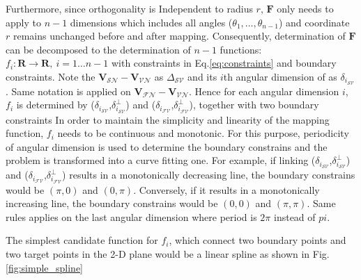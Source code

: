 Furthermore, since orthogonality is Independent to radius $r$, $\mathbf{F}$ only needs to apply to $n-1$ dimensions which includes all angles ($\theta_1,\dots,\theta_{n-1}$) and coordinate $r$ remains unchanged before and after mapping. Consequently, determination of $\mathbf{F}$ can be decomposed to the determination of $n-1$ functions: $f_i: \mathbf{R}\to \mathbf{R},~i=1\dots n-1$ with constraints in Eq.\ref{eq:constraints} and boundary constraints. %
Note the $\mathbf{V}_{\mathcal{SN}} - \mathbf{V}_{\mathcal{VN}}$ as $\Delta_{\mathcal{SV}}$ and its $i$th angular dimension of as $\delta_{i_{{\mathcal{SV}}}}$. Same notation is applied on $\mathbf{V}_{\mathcal{FN}} - \mathbf{V}_{\mathcal{VN}}$. %
Hence for each angular dimension $i$, $f_i$ is determined by ($\delta_{i_{{\mathcal{SV}}}}$,$\delta^{\perp}_{i_{{\mathcal{SV}}}}$) and ($\delta_{i_{{\mathcal{FV}}}}$,$\delta^{\perp}_{i_{{\mathcal{FV}}}}$), together with two boundary constraints
In order to maintain the simplicity and linearity of the mapping function, $f_i$ needs to be continuous and monotonic. For this purpose, periodicity of angular dimension is used to determine the boundary constrains and the problem is transformed into a curve fitting one. For example, if linking ($\delta_{i_{{\mathcal{SV}}}}$,$\delta^{\perp}_{i_{{\mathcal{SV}}}}$) and ($\delta_{i_{{\mathcal{FV}}}}$,$\delta^{\perp}_{i_{{\mathcal{FV}}}}$) results in a monotonically decreasing line, the boundary constrains would be $(\pi,0)$ and $(0,\pi)$. Conversely, if it results in a monotonically increasing line, the boundary constrains would be $(0,0)$ and $(\pi,\pi)$. Same rules applies on the last angular dimension where period is $2\pi$ instead of $pi$.

The simplest candidate function for $f_i$, which connect two boundary points and two target points in the 2-D plane would be a linear spline as shown in Fig.\ref{fig:simple_spline}

